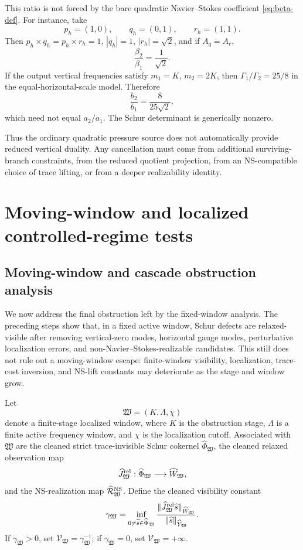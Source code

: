 \documentclass[11pt]{article}
\numberwithin{equation}{section}
\newcommand{\NS}{\mathrm{NS}}
\begin{document}
This ratio is not forced by the bare quadratic Navier--Stokes coefficient \eqref{eq:beta-def}.  For instance, take
\[
        p_h=(1,0),
        \qquad q_h=(0,1),
        \qquad r_h=(1,1).
\]
Then \(p_h\times q_h=p_h\times r_h=1\), \(|q_h|=1\), \(|r_h|=\sqrt2\), and if \(A_q=A_r\),
\[
        \frac{\beta_2}{\beta_1}=\frac1{\sqrt2}.
\]
If the output vertical frequencies satisfy \(m_1=K\), \(m_2=2K\), then \(\Gamma_1/\Gamma_2=25/8\) in the equal-horizontal-scale model.  Therefore
\[
        \frac{b_2}{b_1}=\frac{8}{25\sqrt2},
\]
which need not equal \(a_2/a_1\).  The Schur determinant is generically nonzero.

Thus the ordinary quadratic pressure source does not automatically provide reduced vertical duality.  Any cancellation must come from additional surviving-branch constraints, from the reduced quotient projection, from an \(\NS\)-compatible choice of trace lifting, or from a deeper realizability identity.


\section{Moving-window and localized controlled-regime tests}\label{app:moving-window}

\subsection{Moving-window and cascade obstruction analysis}\label{subsec:moving-window-cascade-obstruction}

We now address the final obstruction left by the fixed-window analysis.  The preceding steps show that, in a fixed active window, Schur defects are relaxed-visible after removing vertical-zero modes, horizontal gauge modes, perturbative localization errors, and non-Navier--Stokes-realizable candidates.  This still does not rule out a moving-window escape: finite-window visibility, localization, trace-cost inversion, and NS-lift constants may deteriorate as the stage and window grow.

Let
\[
        \mathfrak W=(K,\Lambda,\chi)
\]
denote a finite-stage localized window, where \(K\) is the obstruction stage, \(\Lambda\) is a finite active frequency window, and \(\chi\) is the localization cutoff.  Associated with \(\mathfrak W\) are the cleaned strict trace-invisible Schur cokernel \(\widehat\Phi_{\mathfrak W}\), the cleaned relaxed observation map
\[
        \widehat J_{\mathfrak W}^{\rm rel}:
        \widehat\Phi_{\mathfrak W}\longrightarrow \widehat W_{\mathfrak W},
\]
and the NS-realization map \(\widehat{\mathcal R}_{\mathfrak W}^{\rm NS}\).  Define the cleaned visibility constant
\[
        \gamma_{\mathfrak W}
        =
        \inf_{0\neq \widehat s\in\widehat\Phi_{\mathfrak W}}
        \frac{\|\widehat J_{\mathfrak W}^{\rm rel}\widehat s\|_{\widehat W_{\mathfrak W}}}
        {\|\widehat s\|_{\widehat Y_{\mathfrak W}}}.
\]
If \(\gamma_{\mathfrak W}>0\), set \(\mathcal V_{\mathfrak W}=\gamma_{\mathfrak W}^{-1}\); if \(\gamma_{\mathfrak W}=0\), set \(\mathcal V_{\mathfrak W}=+\infty\).
\end{document}

